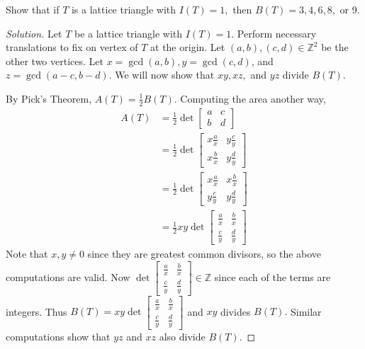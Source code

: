 \documentclass[12pt]{article}
\newcommand{\Z}{\mathbb{Z}}
\newenvironment{exercise}[2][Exercise]{\begin{trivlist}
        \item[\hskip \labelsep {\bfseries #1}\hskip \labelsep {\bfseries #2.}]}{\end{trivlist}}
\newenvironment{solution}
        {\begin{proof}[Solution]}
                    {\end{proof}}
\begin{document}
\begin{exercise}{78}
    Show that if \( T \) is a lattice triangle with \( I(T) = 1, \) then \( B(T) = 3, 4, 6, 8 , \) or 9.
    \begin{solution}
        Let \( T \) be a lattice triangle with \( I(T) = 1. \) Perform necessary translations to fix on vertex of \( T \) at the origin. Let \( (a,b) , (c,d) \in \Z^{2} \) be the other two vertices. Let \( x = \gcd(a,b) , y = \gcd(c,d) \), and \( z = \gcd(a-c, b-d) . \) We will now show that \( xy, xz, \) and \( yz \) divide \( B(T) . \)

        By Pick's Theorem, \( A(T) = \frac{1}{2} B(T) . \) Computing the area another way,
        \begin{align*}
            A(T) &= \frac{1}{2} \det
            \begin{bmatrix}
                a & c\\
                b & d
            \end{bmatrix}\\
            &= \frac{1}{2} \det
            \begin{bmatrix}
                x \frac{a}{x} & y \frac{c}{y} \\
                x \frac{b}{x} & y \frac{d}{y}
            \end{bmatrix}\\
            &= \frac{1}{2} \det
            \begin{bmatrix}
                x \frac{a}{x} & x \frac{b}{x} \\
                y \frac{c}{y} & y\frac{d}{y}
            \end{bmatrix}\\
            &= \frac{1}{2} xy \det
            \begin{bmatrix}
                \frac{a}{x} & \frac{b}{x} \\
                \frac{c}{y} & \frac{d}{y}
            \end{bmatrix}
        \end{align*}
        Note that \( x , y \neq 0 \) since they are greatest common divisors, so the above computations are valid. Now \( \det
            \begin{bmatrix}
                \frac{a}{x} & \frac{b}{x} \\
                \frac{c}{y} & \frac{d}{y}
            \end{bmatrix} \in \Z\)
            since each of the terms are integers. Thus \( B(T) = xy \det
            \begin{bmatrix}
                \frac{a}{x} & \frac{b}{x} \\
                \frac{c}{y} & \frac{d}{y}
            \end{bmatrix}
        \) and \( xy \) divides \( B(T) . \) Similar computations show that \( yz \) and \( xz \) also divide \( B(T) . \)


\end{solution}
\end{exercise}
\end{document}
